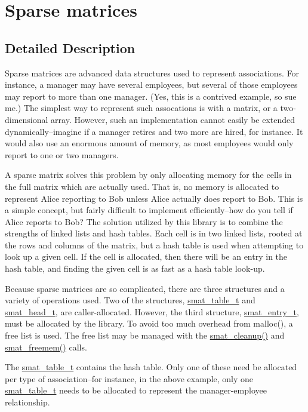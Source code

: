 \hypertarget{group__dbprim__smat}{
\section{Sparse matrices}
\label{group__dbprim__smat}
}


\subsection{Detailed Description}
Sparse matrices are advanced data structures used to represent associations. For instance, a manager may have several employees, but several of those employees may report to more than one manager. (Yes, this is a contrived example, so sue me.) The simplest way to represent such assocations is with a matrix, or a two-dimensional array. However, such an implementation cannot easily be extended dynamically--imagine if a manager retires and two more are hired, for instance. It would also use an enormous amount of memory, as most employees would only report to one or two managers.

A sparse matrix solves this problem by only allocating memory for the cells in the full matrix which are actually used. That is, no memory is allocated to represent Alice reporting to Bob unless Alice actually does report to Bob. This is a simple concept, but fairly difficult to implement efficiently--how do you tell if Alice reports to Bob? The solution utilized by this library is to combine the strengths of linked lists and hash tables. Each cell is in two linked lists, rooted at the rows and columns of the matrix, but a hash table is used when attempting to look up a given cell. If the cell is allocated, then there will be an entry in the hash table, and finding the given cell is as fast as a hash table look-up.

Because sparse matrices are so complicated, there are three structures and a variety of operations used. Two of the structures, \hyperlink{group__dbprim__smat_a0}{smat\_\-table\_\-t} and \hyperlink{group__dbprim__smat_a1}{smat\_\-head\_\-t}, are caller-allocated. However, the third structure, \hyperlink{group__dbprim__smat_a2}{smat\_\-entry\_\-t}, must be allocated by the library. To avoid too much overhead from malloc(), a free list is used. The free list may be managed with the \hyperlink{group__dbprim__smat_a7}{smat\_\-cleanup()} and \hyperlink{group__dbprim__smat_a8}{smat\_\-freemem()} calls.

The \hyperlink{group__dbprim__smat_a0}{smat\_\-table\_\-t} contains the hash table. Only one of these need be allocated per type of association--for instance, in the above example, only one \hyperlink{group__dbprim__smat_a0}{smat\_\-table\_\-t} needs to be allocated to represent the manager-employee relationship.

